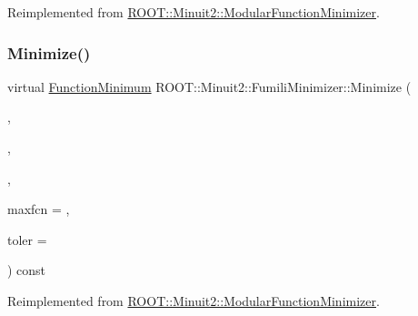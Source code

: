 Reimplemented from \mbox{\hyperlink{classROOT_1_1Minuit2_1_1ModularFunctionMinimizer_a2e1e21161544b931511204cdedac914d}{R\+O\+O\+T\+::\+Minuit2\+::\+Modular\+Function\+Minimizer}}.

\mbox{\label{classROOT_1_1Minuit2_1_1FumiliMinimizer_a2bffd3a7c3090b841f8c23248b83b16e}} 
\subsubsection{\texorpdfstring{Minimize()}{Minimize()}\hspace{0.1cm}{\footnotesize\ttfamily [6/33]}}
{\footnotesize\ttfamily virtual \mbox{\hyperlink{classROOT_1_1Minuit2_1_1FunctionMinimum}{Function\+Minimum}} R\+O\+O\+T\+::\+Minuit2\+::\+Fumili\+Minimizer\+::\+Minimize (\begin{DoxyParamCaption}\item[{const \mbox{\hyperlink{classROOT_1_1Minuit2_1_1FCNGradientBase}{F\+C\+N\+Gradient\+Base}} \&}]{,  }\item[{const \mbox{\hyperlink{classROOT_1_1Minuit2_1_1MnUserParameterState}{Mn\+User\+Parameter\+State}} \&}]{,  }\item[{const \mbox{\hyperlink{classROOT_1_1Minuit2_1_1MnStrategy}{Mn\+Strategy}} \&}]{,  }\item[{unsigned int}]{maxfcn = {},  }\item[{double}]{toler = {} }\end{DoxyParamCaption}) const\hspace{0.3cm}{\ttfamily [virtual]}}



Reimplemented from \mbox{\hyperlink{classROOT_1_1Minuit2_1_1ModularFunctionMinimizer_a2e1e21161544b931511204cdedac914d}{R\+O\+O\+T\+::\+Minuit2\+::\+Modular\+Function\+Minimizer}}.

\mbox{\label{classROOT_1_1Minuit2_1_1FumiliMinimizer_ab9ec6dd4a0e664db7d23a3ea3b0a3c75}} 
